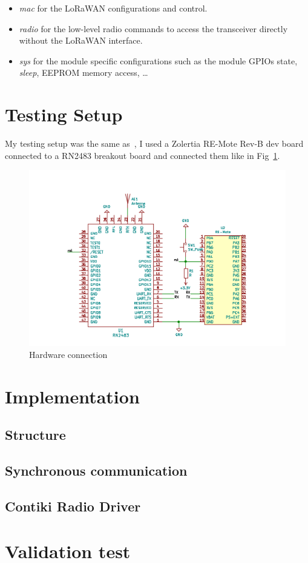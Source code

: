 \begin{itemize}
  \item \emph{mac} for the LoRaWAN configurations and control.
  \item \emph{radio} for the low-level radio commands to access the transceiver
    directly without the LoRaWAN interface.
  \item \emph{sys} for the module specific configurations such as the module
    GPIOs state, \emph{sleep}, EEPROM memory access, \ldots
\end{itemize}

\section{Testing Setup}

My testing setup was the same as~\cite{8847137}, I used a Zolertia RE-Mote
Rev-B dev board connected to a RN2483 breakout board and connected them like in
Fig~\ref{fig:schemaconn}.

\begin{figure}[H]
  \centering
  \includegraphics[scale=0.75]{thesis.tex/chapters/driver/fig/conn_diag.pdf}
  \caption{Hardware connection}
  \label{fig:schemaconn}
\end{figure}

\section{Implementation}

\subsection{Structure}

\subsection{Synchronous communication}

\subsection{Contiki Radio Driver}

\section{Validation test}
